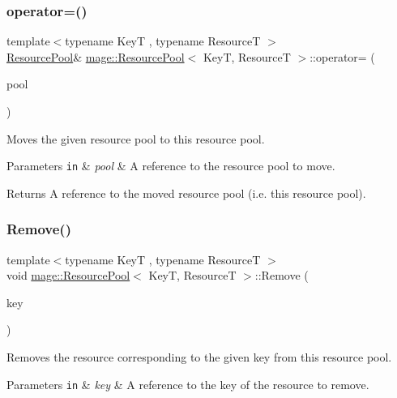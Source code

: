 \subsubsection{\texorpdfstring{operator=()}{operator=()}\hspace{0.1cm}{\footnotesize\ttfamily [2/2]}}
{\footnotesize\ttfamily template$<$typename KeyT , typename ResourceT $>$ \\
\hyperlink{classmage_1_1_resource_pool}{Resource\+Pool}\& \hyperlink{classmage_1_1_resource_pool}{mage\+::\+Resource\+Pool}$<$ KeyT, ResourceT $>$\+::operator= (\begin{DoxyParamCaption}\item[{\hyperlink{classmage_1_1_resource_pool}{Resource\+Pool}$<$ KeyT, ResourceT $>$ \&\&}]{pool }\end{DoxyParamCaption})\hspace{0.3cm}{\ttfamily [delete]}}

Moves the given resource pool to this resource pool.


\begin{DoxyParams}[1]{Parameters}
\mbox{\tt in}  & {\em pool} & A reference to the resource pool to move. \\
\hline
\end{DoxyParams}
\begin{DoxyReturn}{Returns}
A reference to the moved resource pool (i.\+e. this resource pool). 
\end{DoxyReturn}
\hypertarget{classmage_1_1_resource_pool_a58801a2c21f973e18b84277ddaa60d74}{}\label{classmage_1_1_resource_pool_a58801a2c21f973e18b84277ddaa60d74} 
\subsubsection{\texorpdfstring{Remove()}{Remove()}}
{\footnotesize\ttfamily template$<$typename KeyT , typename ResourceT $>$ \\
void \hyperlink{classmage_1_1_resource_pool}{mage\+::\+Resource\+Pool}$<$ KeyT, ResourceT $>$\+::Remove (\begin{DoxyParamCaption}\item[{const KeyT \&}]{key }\end{DoxyParamCaption})}

Removes the resource corresponding to the given key from this resource pool.


\begin{DoxyParams}[1]{Parameters}
\mbox{\tt in}  & {\em key} & A reference to the key of the resource to remove. \\
\hline
\end{DoxyParams}
\hypertarget{classmage_1_1_resource_pool_ab524641cccb1edbf761b94779b5ca5bc}{}\label{classmage_1_1_resource_pool_ab524641cccb1edbf761b94779b5ca5bc} 
